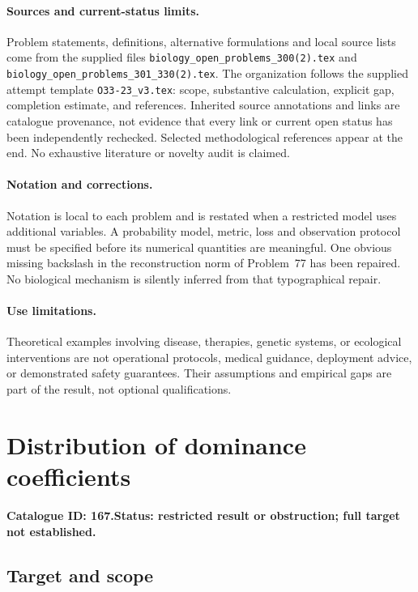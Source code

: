 \documentclass[11pt]{article}
\begin{document}
\paragraph{Sources and current-status limits.}
Problem statements, definitions, alternative formulations and local source lists
come from the supplied files
\texttt{biology\_open\_problems\_300(2).tex} and
\texttt{biology\_open\_problems\_301\_330(2).tex}.
The organization follows the supplied attempt template
\texttt{O33-23\_v3.tex}: scope, substantive calculation, explicit gap,
completion estimate, and references. Inherited source annotations and links are
catalogue provenance, not evidence that every link or current open status has
been independently rechecked. Selected methodological references appear at the
end. No exhaustive literature or novelty audit is claimed.

\paragraph{Notation and corrections.}
Notation is local to each problem and is restated when a restricted model uses
additional variables. A probability model, metric, loss and observation protocol
must be specified before its numerical quantities are meaningful. One obvious
missing backslash in the reconstruction norm of Problem~77 has been repaired.
No biological mechanism is silently inferred from that typographical repair.

\paragraph{Use limitations.}
Theoretical examples involving disease, therapies, genetic systems, or ecological
interventions are not operational protocols, medical guidance, deployment advice,
or demonstrated safety guarantees. Their assumptions and empirical gaps are part
of the result, not optional qualifications.

\setcounter{section}{166}
\section{Distribution of dominance coefficients}
\label{prob:167}
\noindent\textbf{Catalogue ID: 167.}\quad \textbf{Status: restricted result or obstruction; full target not established.}
\subsection{Target and scope}
\end{document}

